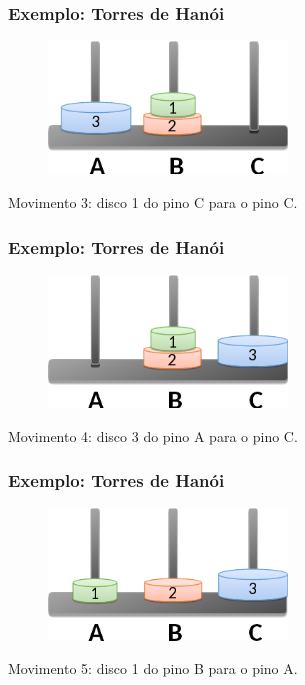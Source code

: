\documentclass[aspectratio=169]{beamer}
\begin{document}

\begin{frame}
\frametitle{Exemplo: Torres de Hanói}

\begin{figure}[!h]
  \centering
  \includegraphics[width=180pt]{imgs/exemplo_torre_hanoi4.png}
  \label{fig_torre_hanoi5}
\end{figure}
Movimento 3: disco 1 do pino C para o pino C.
\end{frame}


\begin{frame}
\frametitle{Exemplo: Torres de Hanói}

\begin{figure}[!h]
  \centering
  \includegraphics[width=180pt]{imgs/exemplo_torre_hanoi5.png}
  \label{fig_torre_hanoi6}
\end{figure}
Movimento 4: disco 3 do pino A para o pino C.
\end{frame}


\begin{frame}
\frametitle{Exemplo: Torres de Hanói}

\begin{figure}[!h]
  \centering
  \includegraphics[width=180pt]{imgs/exemplo_torre_hanoi6.png}
  \label{fig_torre_hanoi7}
\end{figure}
Movimento 5: disco 1 do pino B para o pino A.
\end{frame}
\end{document}
